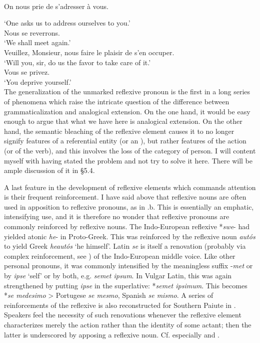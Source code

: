 \ea\label{ex:E21}
\langinfo{\LangFren}{}{} \\
 \ea  On nous prie de s'adresser à vous.

\glt ‘One asks us to address ourselves to you.’\\
\ex Nous se reverrons.\\
\glt ‘We shall meet again.’\\
\ex Veuillez, Monsieur, nous faire le plaisir de s'en occuper.\\
\glt ‘Will you, sir, do us the favor to take care of it.’\\
\ex Vous se privez.\\
\glt ‘You deprive yourself.’\\
\z
\z
\noindent The generalization of the unmarked reflexive pronoun is the first in a long series of phenomena which raise the intricate question of the difference between grammaticalization and analogical extension. On the one hand, it would be easy enough to argue that what we have here is analogical extension. On the other hand, the semantic bleaching of the reflexive element causes it to no longer signify features of a referential entity (or an \np), but rather features of the action (or of the verb), and this involves the loss of the category of person. I will content myself with having stated the problem and not try to solve it here. There will be ample discussion of it in §5.4.

A last feature in the development of reflexive elements which commands attention is their frequent reinforcement. I have said above that reflexive nouns are often used in apposition to reflexive pronouns, as in .b. This is essentially an emphatic, intensifying use, and it is therefore no wonder that reflexive pronouns are commonly reinforced by reflexive nouns. The Indo-European reflexive *\textit{swe}{}- had yielded atonic \textit{he}{}- in Proto-Greek. This was reinforced by the reflexive noun \textit{autós} to yield Greek \textit{heautós} ‘he himself’. Latin \textit{se} is itself a renovation (probably via complex reinforcement, see ) of the Indo-European middle voice. Like other personal pronouns, it was commonly intensified by the meaningless suffix -\textit{met} or by \textit{ipse} ‘self’ or by both, e.g. \textit{semet ipsum}. In Vulgar Latin, this was again strengthened by putting \textit{ipse} in the superlative: *\textit{semet ipsimum}. This becomes *\textit{se medesimo} {\textgreater} Portugese \textit{se mesmo}, Spanish \textit{se mismo}. A series of reinforcements of the reflexive is also reconstructed for Southern Paiute in \citet[107]{Langacker1977}. Speakers feel the necessity of such renovations whenever the reflexive element characterizes merely the action rather than the identity of some actant; then the latter is underscored by apposing a reflexive noun. Cf. especially \citet[238--244]{Faltz1977} and \citet[329--334]{Strunk1980}.

